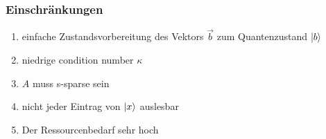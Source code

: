 \begin{frame}
    \frametitle{Einschränkungen}
    \begin{enumerate}
        \item einfache Zustandsvorbereitung des Vektors $\vec b$ zum Quantenzustand $\ket{b}$

        \hfil

        \item niedrige condition number $\kappa$ 

        \hfil


        \item $A$ muss s-sparse sein

        \hfil


        \item nicht jeder Eintrag von $\ket{x}$ auslesbar

        \hfil


        \item Der Ressourcenbedarf sehr hoch


    \end{enumerate}

\end{frame}


